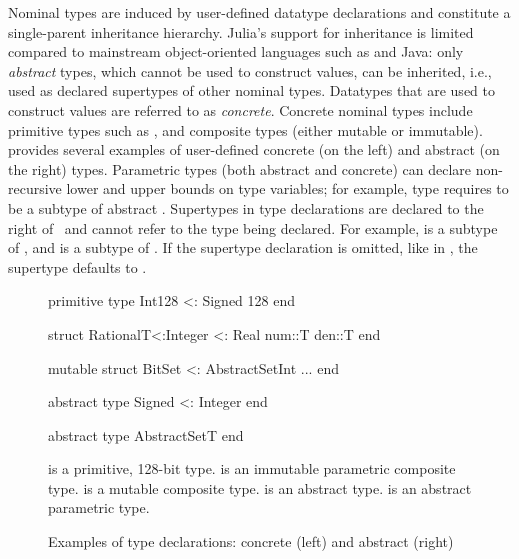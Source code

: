 Nominal types are induced by user-defined datatype declarations and constitute
a single-parent inheritance hierarchy.
Julia's support for inheritance is limited compared to mainstream 
object-oriented languages such as \CSharp and Java: only \emph{abstract} types,
which cannot be used to construct values, can be inherited,
i.e., used as declared supertypes of other nominal types.
Datatypes that are used to construct values are referred to as
\emph{concrete}. Concrete nominal types include primitive types
such as , and composite  types (either mutable or
immutable).
 provides several examples of user-defined
concrete (on the left) and abstract (on the right) types.
Parametric types (both abstract and concrete) 
can declare non-recursive lower and upper bounds on type variables;
for example, type  requires  to be a subtype of
abstract .
Supertypes in type declarations are declared to the right of~\cjl{<:}
and cannot refer to the type being declared.
For example,  is a subtype of , and  is a
subtype of . If the supertype declaration is omitted, like in
, the supertype defaults to .

\begin{figure}[t] 
\begin{minipage}{5.5cm}
\begin{julia}
primitive type Int128 <: Signed 128
end

struct Rational{T<:Integer} <: Real
  num::T
  den::T
end

mutable struct
  BitSet <: AbstractSet{Int}
  ...
end
\end{julia}
\end{minipage}
\hspace{1.2cm}
\begin{minipage}{4.8cm}
\begin{julia}
abstract type Signed <: Integer
end

abstract type AbstractSet{T}
end
\end{julia}
\end{minipage}
\caption{Examples of type declarations: concrete (left) and abstract (right)
}\label{fig:code:user-def-types}
\begin{tablenotes}[para]
\small
   is a primitive, 128-bit type.
   is an immutable parametric composite type.
   is a mutable composite type.
   is an abstract type.
   is an abstract parametric type.
\end{tablenotes}
\end{figure}

